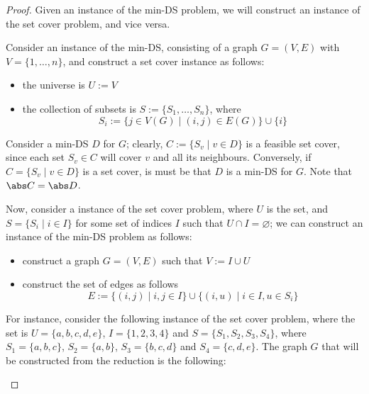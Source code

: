\documentclass[a4paper, 12pt]{report}
\begin{document}
    \begin{proof}
        Given an instance of the min-DS problem, we will construct an instance of the set cover problem, and vice versa.

        Consider an instance of the min-DS, consisting of a graph $G = (V, E)$ with $V = \{1, \ldots, n \}$, and construct a set cover instance as follows:

        \begin{itemize}
            \item the universe is $U := V$
            \item the collection of subsets is $S := \{S_1, \ldots, S_n\}$, where $$S_i := \{j \in V(G) \mid (i,j) \in E(G)\} \cup \{i\}$$
        \end{itemize}

        Consider a min-DS $D$ for $G$; clearly, $C := \{S_v \mid v \in D\}$ is a feasible set cover, since each set $S_v \in C$ will cover $v$ and all its neighbours. Conversely, if $C = \{S_v \mid v \in D\}$ is a set cover, is must be that $D$ is a min-DS for $G$. Note that $\abs C = \abs D$.

        Now, consider a instance of the set cover problem, where $U$ is the  set, and $S = \{S_i \mid i \in I\}$ for some set of indices $I$ such that $U \cap I = \varnothing$; we can construct an instance of the min-DS problem as follows:

        \begin{itemize}
            \item construct a graph $G = (V, E)$ such that $V := I \cup U$
            \item construct the set of edges as follows $$E := \{(i, j) \mid i, j \in I\} \cup \{(i, u) \mid i \in I, u \in S_i\}$$
        \end{itemize}

        For instance, consider the following instance of the set cover problem, where the  set is $U = \{a, b, c, d, e\}$, $I = \{1, 2, 3, 4\}$ and $S = \{S_1, S_2, S_3, S_4\}$, where $S_1 = \{a, b, c\}$, $S_2 =\{a, b\}$, $S_3 = \{b, c, d\}$ and $S_4 = \{c, d, e\}$. The graph $G$ that will be constructed from the reduction is the following:

        \begin{figure}[H]
            \centering
            \begin{tikzpicture}[node distance={20mm}, thick, main/.style = {draw, circle}, minimum size = 7mm] 


\end{tikzpicture}
\end{figure}
\end{proof}
\end{document}
